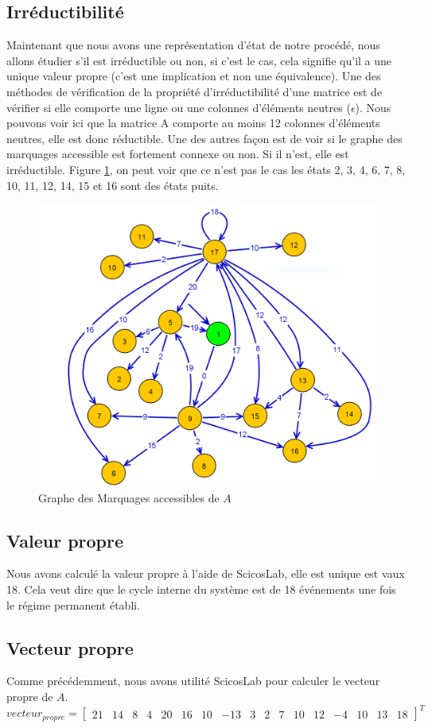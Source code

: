 \subsection{Irréductibilité}
Maintenant que nous avons une représentation d'état de notre procédé, nous allons étudier s'il est irréductible ou non, si c'est le cas, cela signifie qu'il a une unique valeur propre (c'est une implication et non une équivalence). Une des méthodes de vérification de la propriété d'irréductibilité d'une matrice est de vérifier si elle comporte une ligne ou une colonnes d'éléments neutres ($\epsilon$).
Nous pouvons voir ici que la matrice A comporte au moins 12 colonnes d'éléments neutres, elle est donc réductible. Une des autres façon est de voir si le graphe des marquages accessible est fortement connexe ou non. Si il n'est, elle est irréductible. Figure \ref{fig:gma_train}, on peut voir que ce n'est pas le cas les états 2, 3, 4, 6, 7, 8, 10, 11, 12, 14, 15 et 16 sont des états puits.
\begin{figure}[!ht]
\centering
\includegraphics[width = .4\textwidth]{./I/images/GMA.png}
\caption{\label{fig:gma_train} Graphe des Marquages accessibles de $A$}
\end{figure}
\subsection{Valeur propre}
Nous avons calculé la valeur propre à l'aide de ScicosLab, elle est unique est vaux 18. Cela veut dire que le cycle interne du système est de 18 événements une fois le régime permanent établi.
\subsection{Vecteur propre}
Comme précédemment, nous avons utilité ScicosLab pour calculer le vecteur propre de $A$.
\begin{equation}
vecteur_{propre} = 
\left[
\begin{array}{ccccccccccccccccc}
21 & 14 & 8 & 4 & 20 & 16 & 10 & -13 & 3 & 2 & 7 & 10 & 12 & -4 & 10 & 13 & 18	
\end{array} \right]^T
\end{equation}

